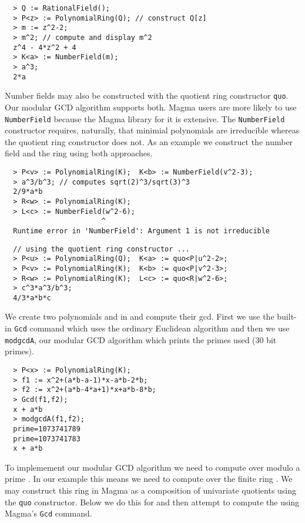 \documentclass[10pt]{article}
\begin{document}
{ \small
\begin{verbatim}
  > Q := RationalField();
  > P<z> := PolynomialRing(Q); // construct Q[z]
  > m := z^2-2;
  > m^2; // compute and display m^2
  z^4 - 4*z^2 + 4
  > K<a> := NumberField(m);
  > a^3;
  2*a
\end{verbatim}
}


\noindent Number fields may also be constructed with the quotient
ring constructor {\tt quo}. Our modular GCD algorithm supports both.
Magma users are more likely to use {\tt NumberField} because the
Magma library for it is extensive. The {\tt NumberField} constructor
requires, naturally, that minimial polynomials are irreducible
whereas the quotient ring constructor does not. As an example we
construct the number field  and the ring
 using both approaches.

{ \small
\begin{verbatim}
  > P<v> := PolynomialRing(K);  K<b> := NumberField(v^2-3);
  > a^3/b^3; // computes sqrt(2)^3/sqrt(3)^3
  2/9*a*b
  > R<w> := PolynomialRing(K);
  > L<c> := NumberField(w^2-6);
                       ^
  Runtime error in 'NumberField': Argument 1 is not irreducible
\end{verbatim}
\begin{verbatim}
  // using the quotient ring constructor ...
  > P<u> := PolynomialRing(Q);  K<a> := quo<P|u^2-2>;
  > P<v> := PolynomialRing(K);  K<b> := quo<P|v^2-3>;
  > R<w> := PolynomialRing(K);  L<c> := quo<R|w^2-6>;
  > c^3*a^3/b^3;
  4/3*a*b*c
\end{verbatim}
}

\noindent
We create two polynomials  and  in  and
compute their gcd.  First we use the built-in {\tt Gcd} command
which uses the ordinary Euclidean algorithm and then we use {\tt modgcdA},
our modular GCD algorithm which prints the primes used (30 bit primes).

{ \small
\begin{verbatim}
  > P<x> := PolynomialRing(K);
  > f1 := x^2+(a*b-a-1)*x-a*b-2*b;
  > f2 := x^2+(a*b-4*a+1)*x+a*b-8*b;
  > Gcd(f1,f2);
  x + a*b
  > modgcdA(f1,f2);
  prime=1073741789
  prime=1073741783
  x + a*b
\end{verbatim}
}

\noindent
To implemement our modular GCD algorithm we need to compute over  modulo
a prime .  In our example this means we need to compute over the
finite ring .
We may construct this ring in Magma as a composition of univariate
quotients using the {\tt quo} constructor.  Below we do this for  and
then attempt to compute the 
using Magma's {\tt Gcd} command.
\end{document}
